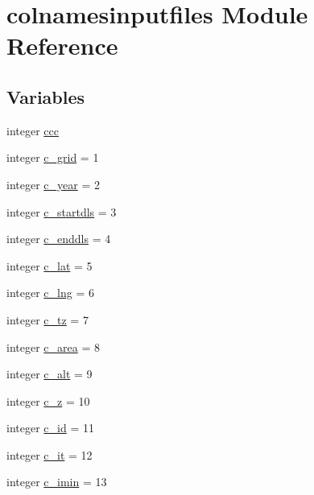 \hypertarget{namespacecolnamesinputfiles}{}\section{colnamesinputfiles Module Reference}
\label{namespacecolnamesinputfiles}
\subsection*{Variables}
\begin{DoxyCompactItemize}
\item 
integer \hyperlink{namespacecolnamesinputfiles_adb0ede73a6346d7e8fd56b1f1e3d1fc4}{ccc}
\item 
integer \hyperlink{namespacecolnamesinputfiles_a334c7aef52fe2d0196e09b041ef19c9a}{c\+\_\+grid} = 1
\item 
integer \hyperlink{namespacecolnamesinputfiles_a5d453725b0ca2cbc00c9b7a5026d8e2b}{c\+\_\+year} = 2
\item 
integer \hyperlink{namespacecolnamesinputfiles_a654ffd5c6d266efea6259fbea77c8ef1}{c\+\_\+startdls} = 3
\item 
integer \hyperlink{namespacecolnamesinputfiles_af8181e64694030ff21479a0517c9e34c}{c\+\_\+enddls} = 4
\item 
integer \hyperlink{namespacecolnamesinputfiles_ac8c590f73817d76bf8bc5a3112849469}{c\+\_\+lat} = 5
\item 
integer \hyperlink{namespacecolnamesinputfiles_a0bb41b0e2c57e9d0de720760f8032531}{c\+\_\+lng} = 6
\item 
integer \hyperlink{namespacecolnamesinputfiles_a180027882e04f8ca091e0e9560408c66}{c\+\_\+tz} = 7
\item 
integer \hyperlink{namespacecolnamesinputfiles_ab046741b2639e30b8e2ca22061ed6711}{c\+\_\+area} = 8
\item 
integer \hyperlink{namespacecolnamesinputfiles_adebe514d38a358892ea83a34e671956b}{c\+\_\+alt} = 9
\item 
integer \hyperlink{namespacecolnamesinputfiles_af04de24c8940348bbdc10a583bbf396d}{c\+\_\+z} = 10
\item 
integer \hyperlink{namespacecolnamesinputfiles_a060322ec717b9accb785ec79a50c5cd9}{c\+\_\+id} = 11
\item 
integer \hyperlink{namespacecolnamesinputfiles_a63b7102a0bfb2990c3d9ef7d9f3e7a76}{c\+\_\+it} = 12
\item 
integer \hyperlink{namespacecolnamesinputfiles_af4f7bc5a0ee3a5b751aac8da4bd0dbd2}{c\+\_\+imin} = 13

\end{DoxyCompactItemize}
